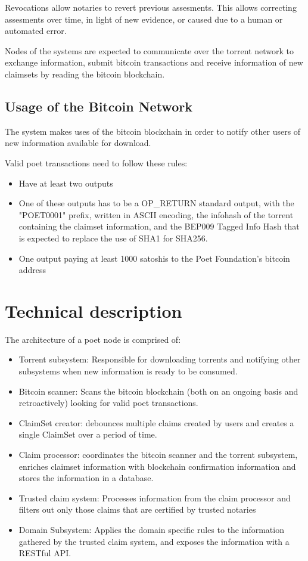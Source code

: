 \documentclass[12pt]{article}
\begin{document}
Revocations allow notaries to revert previous assesments. This allows correcting assesments over time, in light of new evidence, or caused due to a human or automated error.

Nodes of the systems are expected to communicate over the torrent network to exchange information, submit bitcoin transactions and receive information of new claimsets by reading the bitcoin blockchain.

\subsection{Usage of the Bitcoin Network}

The system makes uses of the bitcoin blockchain in order to notify other users of new information available for download.

Valid poet transactions need to follow these rules:
\begin{itemize}
    \item Have at least two outputs
    \item One of these outputs has to be a OP\_RETURN standard output, with
      the "POET0001" prefix, written in ASCII encoding,
      the infohash of the torrent containing the claimset information,
      and the BEP009 Tagged Info Hash that is expected to replace the use of SHA1 for SHA256.
    \item One output paying at least 1000 satoshis to the Poet Foundation's bitcoin address
\end{itemize}

\section{Technical description}

The architecture of a poet node is comprised of:

\begin{itemize}
    \item Torrent subsystem: Responsible for downloading torrents and notifying other subsystems when new information is ready to be consumed.
    \item Bitcoin scanner: Scans the bitcoin blockchain (both on an ongoing basis and retroactively) looking for valid poet transactions.
    \item ClaimSet creator: debounces multiple claims created by users and creates a single ClaimSet over a period of time.
    \item Claim processor: coordinates the bitcoin scanner and the torrent subsystem, enriches claimset information with blockchain confirmation information and stores the information in a database. 
    \item Trusted claim system: Processes information from the claim processor and filters out only those claims that are certified by trusted notaries
    \item Domain Subsystem: Applies the domain specific rules to the information gathered by the trusted claim system, and exposes the information with a RESTful API.
\end{itemize}
\end{document}
